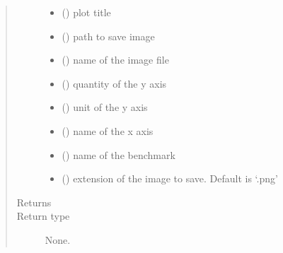 \documentclass[letterpaper,10pt,english]{sphinxmanual}
\begin{document}
\begin{fulllineitems}
\begin{fulllineitems}
\begin{quote}
\begin{description}
\begin{itemize}
\item {} 
 () \textendash{} plot title

\item {} 
 () \textendash{} path to save image

\item {} 
 () \textendash{} name of the image file

\item {} 
 () \textendash{} quantity of the y axis

\item {} 
 () \textendash{} unit of the y axis

\item {} 
 () \textendash{} name of the x axis

\item {} 
 () \textendash{} name of the benchmark

\item {} 
 () \textendash{} extension of the image to save. Default is ‘.png’

\end{itemize}

\item[{Returns}] \leavevmode


\item[{Return type}] \leavevmode
None.

\end{description}\end{quote}

\end{fulllineitems}



\end{fulllineitems}
\end{document}
